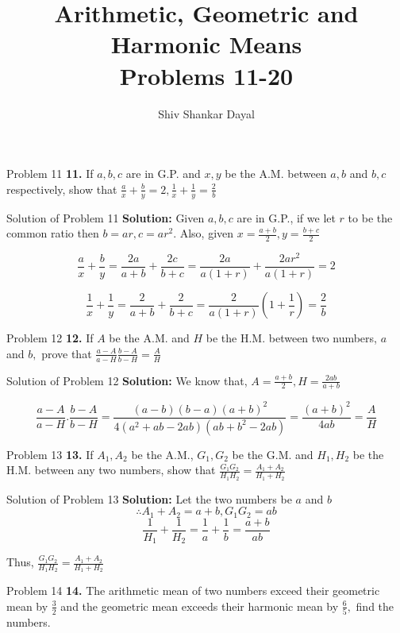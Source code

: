 \documentclass[aspectratio=1610,8pt]{beamer}
\title{Arithmetic, Geometric and Harmonic Means\\Problems 11-20}
\author[Shiv Shankar Dayal]{Shiv Shankar Dayal}
\begin{document}
\begin{frame}
  \titlepage
\end{frame}
\begin{frame}{Problem 11}
  \textbf{11.} If $a, b, c$ are in G.P. and $x, y$ be the A.M. between $a, b$
  and $b, c$ respectively, show that $\frac{a}{x} + \frac{b}{y} = 2,
  \frac{1}{x} + \frac{1}{y} = \frac{2}{b}$
\end{frame}
\begin{frame}{Solution of Problem 11}
  \textbf{Solution:} Given $a, b, c$ are in G.P., if we let $r$ to be the
  common ratio then $b = ar, c= ar^2$. Also, given $x = \frac{a + b}{2}, y =
  \frac{b + c}{2}$

  $$\frac{a}{x} + \frac{b}{y} = \frac{2a}{a + b} + \frac{2c}{b + c} =
  \frac{2a}{a(1 + r)} + \frac{2ar^2}{a(1 + r)} = 2$$

  $$\frac{1}{x} + \frac{1}{y} = \frac{2}{a + b} + \frac{2}{b + c} =
  \frac{2}{a(1 + r)}\left(1 + \frac{1}{r}\right) = \frac{2}{b}$$
\end{frame}
\begin{frame}{Problem 12}
  \textbf{12.} If $A$ be the A.M. and $H$ be the H.M. between two numbers, $a$
  and $b,$ prove that $\frac{a - A}{a - H}\frac{b - A}{b - H} = \frac{A}{H}$
\end{frame}
\begin{frame}{Solution of Problem 12}
  \textbf{Solution:} We know that, $A = \frac{a + b}{2}, H = \frac{2ab}{a + b}$

  $$\frac{a - A}{a - H}.\frac{b - A}{b - H} = \frac{(a - b)(b - a)(a +
    b)^2}{4(a^2 + ab - 2ab)(ab + b^2 - 2ab)} = \frac{(a + b)^2}{4ab} =
  \frac{A}{H}$$
\end{frame}
\begin{frame}{Problem 13}
  \textbf{13.} If $A_1, A_2$ be the A.M., $G_1, G_2$ be the G.M. and $H_1, H_2$
  be the H.M. between any two numbers, show that $\frac{G_1G_2}{H_1H_2} =
  \frac{A_1 + A_2}{H_1 + H_2}$
\end{frame}
\begin{frame}{Solution of Problem 13}
  \textbf{Solution:} Let the two numbers be $a$ and $b$
  $$\therefore A_1 + A_2 = a + b, G_1G_2 = ab$$
  $$\frac{1}{H_1} + \frac{1}{H_2} = \frac{1}{a} + \frac{1}{b} = \frac{a + b}{ab}$$

  Thus, $\frac{G_1G_2}{H_1H_2} = \frac{A_1 + A_2}{H_1 + H_2}$
\end{frame}
\begin{frame}{Problem 14}
  \textbf{14.} The arithmetic mean of two numbers exceed their geometric mean
  by $\frac{3}{2}$ and the geometric mean exceeds their harmonic mean by
  $\frac{6}{5},$ find the numbers.
\end{frame}
\end{document}

